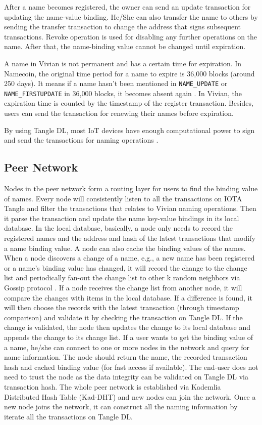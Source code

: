 After a name becomes registered, the owner can send an update transaction for updating the name-value binding. He/She can also transfer the name to others by sending the transfer transaction to change the address that signs subsequent transactions. Revoke operation is used for disabling any further operations on the name. After that, the name-binding value cannot be changed until expiration.

A name in Vivian is not permanent and has a certain time for expiration. In Namecoin, the original time period for a name to expire is 36,000 blocks (around 250 days).
It means if a name hasn't been mentioned in \texttt{NAME\_UPDATE} or \texttt{NAME\_FIRSTUPDATE} in 36,000 blocks, it becomes absent again \cite{kalodner2015empirical}.
In Vivian, the expiration time is counted by the timestamp of the register transaction. Besides, users can send the transaction for renewing their names before expiration.

By using Tangle DL, most IoT devices have enough computational power to sign and send the transactions for naming operations .

\subsection{Peer Network}
Nodes in the peer network form a routing layer for users to find the binding value of names.
Every node will consistently listen to all the transactions on IOTA Tangle and filter the transactions that relates to Vivian naming operations.
Then it parse the transaction and update the name key-value bindings in its local database.
In the local database, basically, a node only needs to record the registered names and the address and hash of the latest transactions that modify a name binding value. A node can also cache the binding values of the names.
When a node discovers a change of a name, e.g., a new name has been registered or a name's binding value has changed, it will record the change to the change list and periodically fan-out the change list to other k random neighbors via Gossip protocol \cite{10.1145/41840.41841}.
If a node receives the change list from another node, it will compare the changes with items in the local database. If a difference is found, it will then choose the records with the latest transaction (through timestamp comparison) and validate it by checking the transaction on Tangle DL. If the change is validated, the node then updates the change to its local database and appends the change to its change list.
If a user wants to get the binding value of a name, he/she can connect to one or more nodes in the network and query for name information. The node should return the name, the recorded transaction hash and cached binding value (for fast access if available). The end-user does not need to trust the node as the data integrity can be validated on Tangle DL via transaction hash.
The whole peer network is established via Kademlia Distributed Hash Table (Kad-DHT) \cite{maymounkov2002kademlia} and new nodes can join the network. Once a new node joins the network, it can construct all the naming information by iterate all the transactions on Tangle DL.

